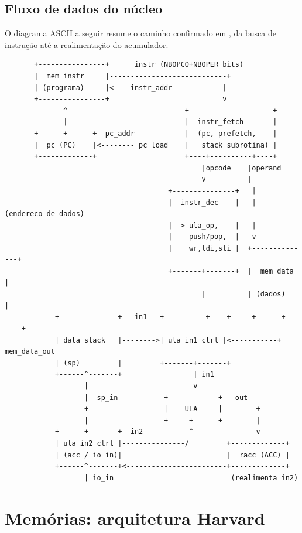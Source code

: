 \subsection{Fluxo de dados do núcleo}
\label{sec:arq-fluxo}

O diagrama ASCII a seguir resume o caminho confirmado em , da busca de
instrução até a realimentação do acumulador.

\begin{lstlisting}
       +----------------+      instr (NBOPCO+NBOPER bits)
       |  mem_instr     |----------------------------+
       | (programa)     |<--- instr_addr            |
       +----------------+                           v
              ^                            +--------------------+
              |                            |  instr_fetch       |
       +------+------+  pc_addr            |  (pc, prefetch,    |
       |  pc (PC)    |<-------- pc_load    |   stack subrotina) |
       +-------------+                     +----+----------+----+
                                               |opcode    |operand
                                               v          |
                                       +---------------+   |
                                       |  instr_dec    |   |  (endereco de dados)
                                       | -> ula_op,    |   |
                                       |    push/pop,  |   v
                                       |    wr,ldi,sti |  +--------------+
                                       +-------+-------+  |  mem_data    |
                                               |          | (dados)      |
            +--------------+   in1   +----------+----+     +------+-------+
            | data stack   |-------->| ula_in1_ctrl |<-----------+ mem_data_out
            | (sp)         |         +-------+-------+
            +------^-------+                 | in1
                   |                         v
                   |  sp_in           +------------+   out
                   +------------------|    ULA     |--------+
                   |                  +-----+------+        |
            +------+-------+  in2           ^               v
            | ula_in2_ctrl |---------------/         +-------------+
            | (acc / io_in)|                         |  racc (ACC) |
            +------^-------+<------------------------+-------------+
                   | io_in                            (realimenta in2)
\end{lstlisting}

\section{Memórias: arquitetura Harvard}
\label{sec:arq-memorias}

